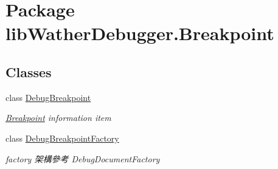 \hypertarget{namespacelib_wather_debugger_1_1_breakpoint}{\section{Package lib\+Wather\+Debugger.\+Breakpoint}
\label{namespacelib_wather_debugger_1_1_breakpoint}
}
\subsection*{Classes}
\begin{DoxyCompactItemize}
\item 
class \hyperlink{classlib_wather_debugger_1_1_breakpoint_1_1_debug_breakpoint}{Debug\+Breakpoint}
\begin{DoxyCompactList}\small\item\em \hyperlink{namespacelib_wather_debugger_1_1_breakpoint}{Breakpoint} information item \end{DoxyCompactList}\item 
class \hyperlink{classlib_wather_debugger_1_1_breakpoint_1_1_debug_breakpoint_factory}{Debug\+Breakpoint\+Factory}
\begin{DoxyCompactList}\small\item\em factory 架構參考 Debug\+Document\+Factory \end{DoxyCompactList}\end{DoxyCompactItemize}

